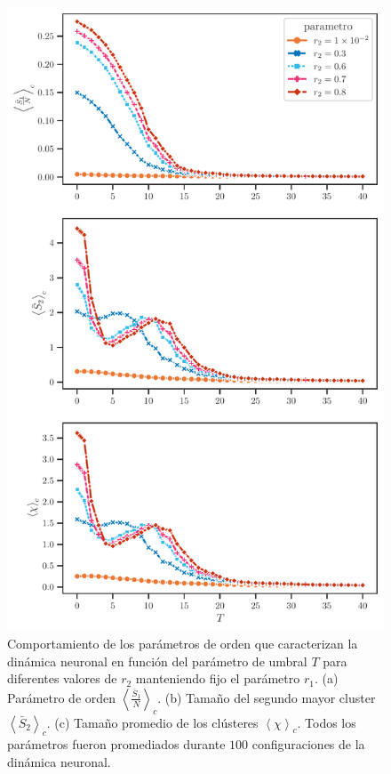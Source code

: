 \begin{figure}[h!]
	\centering\includegraphics[width=\imsize]{variando_r2_hermafrodita.pdf}
	\caption[Comportamiento de los parámetros  que caracterizan la  dinámica neuronal   en función del parámetro de umbral $T$  para diferentes
	valores de $r_2$ manteniendo fijo el parámetro $r_1$.]{Comportamiento de los parámetros de orden que caracterizan la  dinámica neuronal   en función del parámetro de umbral $T$  para diferentes valores de $r_2$ manteniendo fijo el parámetro $r_1$. (a) Parámetro de orden $\left\langle\frac{\bar{S}_1}{N}\right\rangle_c$. (b) Tamaño del segundo mayor cluster $\left\langle\bar{S}_2\right\rangle_c$. (c) Tamaño promedio de los clústeres $\left\langle\chi\right\rangle_c$. Todos los parámetros fueron promediados durante $100$ configuraciones de la dinámica neuronal.}\label{fig:diagrama_fase_variando_r2}
\end{figure}





